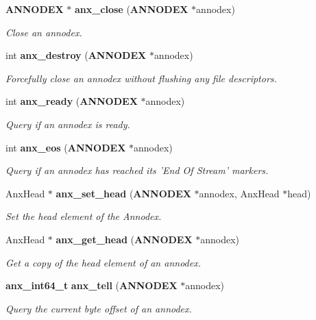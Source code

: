 \begin{CompactItemize}
{\bf ANNODEX} $\ast$ {\bf anx\_\-close} ({\bf ANNODEX} $\ast$annodex)
\begin{CompactList}\small\item\em Close an annodex. \item\end{CompactList}\item 
int {\bf anx\_\-destroy} ({\bf ANNODEX} $\ast$annodex)
\begin{CompactList}\small\item\em Forcefully close an annodex without flushing any file descriptors. \item\end{CompactList}\item 
int {\bf anx\_\-ready} ({\bf ANNODEX} $\ast$annodex)
\begin{CompactList}\small\item\em Query if an annodex is ready. \item\end{CompactList}\item 
int {\bf anx\_\-eos} ({\bf ANNODEX} $\ast$annodex)
\begin{CompactList}\small\item\em Query if an annodex has reached its 'End Of Stream' markers. \item\end{CompactList}\item 
Anx\-Head $\ast$ {\bf anx\_\-set\_\-head} ({\bf ANNODEX} $\ast$annodex, Anx\-Head $\ast$head)
\begin{CompactList}\small\item\em Set the head element of the Annodex. \item\end{CompactList}\item 
Anx\-Head $\ast$ {\bf anx\_\-get\_\-head} ({\bf ANNODEX} $\ast$annodex)
\begin{CompactList}\small\item\em Get a copy of the head element of an annodex. \item\end{CompactList}\item 
{\bf anx\_\-int64\_\-t} {\bf anx\_\-tell} ({\bf ANNODEX} $\ast$annodex)
\begin{CompactList}\small\item\em Query the current byte offset of an annodex. \item\end{CompactList}\item 

\end{CompactItemize}
